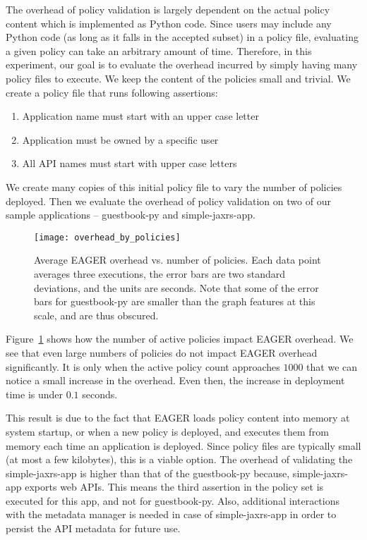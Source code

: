 The overhead of policy validation is largely dependent on the actual policy
content which is implemented as Python code. Since users may include any Python code 
(as long as it falls in the accepted subset) in a policy file, evaluating a
given policy can take an arbitrary amount of time.  Therefore, in this
experiment, our goal is to evaluate the overhead incurred by simply having
many policy files to execute. We keep the content of the policies small and
trivial. We create a policy file that runs following assertions:
\begin{enumerate} 
\item Application name must start with an upper case letter
\item Application must be owned by a specific user 
\item All API names must start with upper case letters 
\end{enumerate} 
We create many copies of this
initial policy file to vary the number of policies deployed. Then we evaluate
the overhead of policy validation on two of our sample applications --
guestbook-py and simple-jaxrs-app. 

\begin{figure}
\centering
\texttt{[image: overhead\_by\_policies]}
\caption{Average EAGER overhead vs. number of policies.  Each data point
averages three executions, the error bars are two standard deviations, and the
units are seconds. Note that some of the error bars for 
guestbook-py are smaller than the graph features at this scale, and are thus obscured.}
\label{fig:overhead_by_policies}
\end{figure}

Figure~\ref{fig:overhead_by_policies} shows how the number of active policies
impact EAGER overhead. We see that even large numbers of policies 
do not impact EAGER overhead significantly. It is only when the active
policy count approaches $1000$ that we can notice a small increase in the
overhead. Even then, the increase in deployment time is under $0.1$ seconds. 

This result is due to the fact that EAGER loads policy content into memory at system
startup, or when a new policy is deployed, and executes them from memory each
time an application is deployed. Since policy files are typically small (at
most a few kilobytes), this is a viable option. The overhead of validating the
simple-jaxrs-app is higher than that of the guestbook-py because,
simple-jaxrs-app exports web APIs. This means the third assertion in the
policy set is executed for this app, and not for guestbook-py. Also, additional
interactions with the metadata manager is needed in case of simple-jaxrs-app
in order to persist the API metadata for future use.

